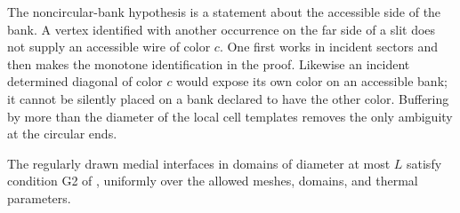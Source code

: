 \begin{remark}
\label{geo:actual-arm}
The noncircular-bank hypothesis is a statement about the accessible
side of the bank. A vertex identified with another occurrence on the
far side of a slit does not supply an accessible wire of color \(c\).
One first works in incident sectors and then makes the monotone
identification in the proof. Likewise an incident determined diagonal
of color \(c\) would expose its own color on an accessible bank; it
cannot be silently placed on a bank declared to have the other color.
Buffering by more than the diameter of the local cell templates removes
the only ambiguity at the circular ends.
\end{remark}

\begin{proposition}
\label{geo:g2}
The regularly drawn medial interfaces in domains of diameter at most
\(L\) satisfy condition G2 of \cite{KS}, uniformly over the allowed
meshes, domains, and thermal parameters.
\end{proposition}

